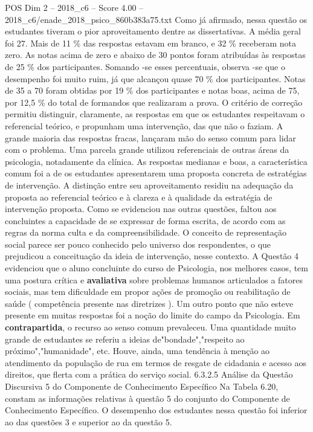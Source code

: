 \begin{textsample}{POS Dim 2 – 2018\_c6 – Score 4.00 – 2018\_c6/enade\_2018\_psico\_860b383a75.txt}
Como já afirmado, nessa questão os estudantes tiveram o pior aproveitamento dentre as dissertativas.
A média geral foi 27.
Mais de 11 \% das respostas estavam em branco, e 32 \% receberam nota zero.
As notas acima de zero e abaixo de 30 pontos foram atribuídas às respostas de 25 \% dos participantes.
Somando -se esses percentuais, observa -se que o desempenho foi muito ruim, já que alcançou quase 70 \% dos participantes.
Notas de 35 a 70 foram obtidas por 19 \% dos participantes e notas boas, acima de 75, por 12,5 \% do total de formandos que realizaram a prova.
O critério de correção permitiu distinguir, claramente, as respostas em que os estudantes respeitavam o referencial teórico, e propunham uma intervenção, das que não o faziam.
A grande maioria das respostas fracas, lançaram mão do senso comum para lidar com o problema.
Uma parcela grande utilizou referenciais de outras áreas da psicologia, notadamente da clínica.
As respostas medianas e boas, a característica comum foi a de os estudantes apresentarem uma proposta concreta de estratégias de intervenção.
A distinção entre seu aproveitamento residiu na adequação da proposta ao referencial teórico e à clareza e à qualidade da estratégia de intervenção proposta.
Como se evidenciou nas outras questões, faltou aos concluintes a capacidade de se expressar de forma escrita, de acordo com as regras da norma culta e da compreensibilidade.
O conceito de representação social parece ser pouco conhecido pelo universo dos respondentes, o que prejudicou a conceituação da ideia de intervenção, nesse contexto.
A Questão 4 evidenciou que o aluno concluinte do curso de Psicologia, nos melhores casos, tem uma postura crítica e \textbf{avaliativa} sobre problemas humanos articulados a fatores sociais, mas tem dificuldade em propor ações de promoção ou reabilitação de saúde ( competência presente nas diretrizes ).
Um outro ponto que não esteve presente em muitas respostas foi a noção do limite do campo da Psicologia.
Em \textbf{contrapartida}, o recurso ao senso comum prevaleceu.
Uma quantidade muito grande de estudantes se referiu a ideias de"bondade","respeito ao próximo","humanidade", etc.
Houve, ainda, uma tendência à menção ao atendimento da população de rua em termos de resgate de cidadania e acesso aos direitos, que flerta com a prática do serviço social. 6.3.2.5 Análise da Questão Discursiva 5 do Componente de Conhecimento Específico Na Tabela 6.20, constam as informações relativas à questão 5 do conjunto do Componente de Conhecimento Específico.
O desempenho dos estudantes nessa questão foi inferior ao das questões 3 e superior ao da questão 5.

\end{textsample}
